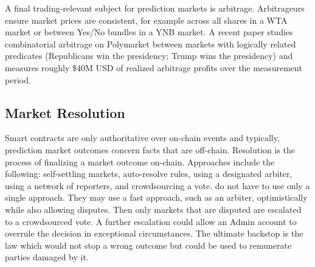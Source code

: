 A final trading-relevant subject for prediction markets is arbitrage. Arbitrageurs ensure market prices are consistent, for example across all shares in a WTA market or between Yes/No bundles in a YNB market. A recent paper studies combinatorial arbitrage on Polymarket between markets with logically related predicates (\eg Republicans win the presidency; Trump wins the presidency) and measures roughly \$40M USD of realized arbitrage profits over the measurement period. 


\subsection{Market Resolution}\label{wf:close}

Smart contracts are only authoritative over on-chain events and typically, prediction market outcomes concern facts that are off-chain. Resolution is the process of finalizing a market outcome on-chain. Approaches include the following: self-settling markets, auto-resolve rules, using a designated arbiter, using a network of reporters, and crowdsourcing a vote. \depms do not have to use only a single approach. They may use a fast approach, such as an arbiter, optimistically while also allowing disputes. Then only markets that are disputed are escalated to a crowdsourced vote. A further escalation could allow an Admin account to overrule the decision in exceptional circumstances. The ultimate backstop is the law which would not stop a wrong outcome but could be used to remunerate parties damaged by it.





